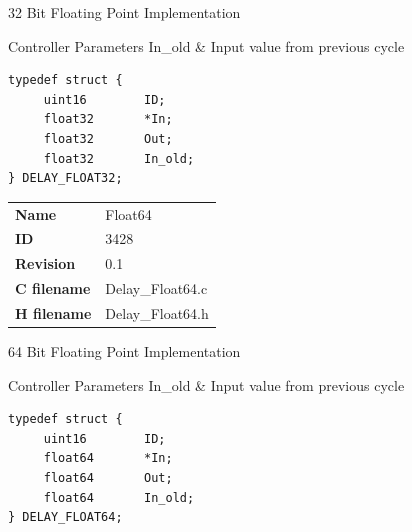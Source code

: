 32 Bit Floating Point Implementation

\begin{XtoCtabular}{Controller Parameters}
In\_old & Input value from previous cycle\tabularnewline
\hline
\end{XtoCtabular}

\begin{lstlisting}
typedef struct {
     uint16        ID;
     float32       *In;
     float32       Out;
     float32       In_old;
} DELAY_FLOAT32;
\end{lstlisting}

\ifdefined \AddTestReports
{}
\fi
{}
\nopagebreak[0]
\begin{tabular}{l l}
\textbf{Name} & Float64 \tabularnewline
\textbf{ID} & 3428 \tabularnewline
\textbf{Revision} & 0.1 \tabularnewline
\textbf{C filename} & Delay\_Float64.c \tabularnewline
\textbf{H filename} & Delay\_Float64.h \tabularnewline
\end{tabular}
\vspace{1ex}

64 Bit Floating Point Implementation

\begin{XtoCtabular}{Controller Parameters}
In\_old & Input value from previous cycle\tabularnewline
\hline
\end{XtoCtabular}

\begin{lstlisting}
typedef struct {
     uint16        ID;
     float64       *In;
     float64       Out;
     float64       In_old;
} DELAY_FLOAT64;
\end{lstlisting}

\ifdefined \AddTestReports
{}
\fi
